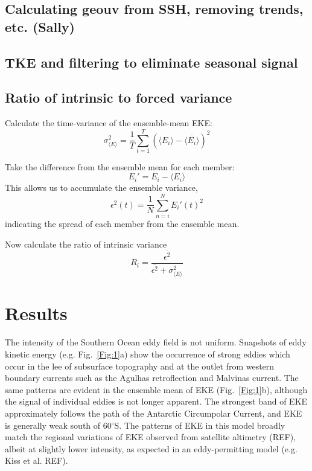 \documentclass{agujournal2019}
\begin{document}
\subsection{Calculating geouv from SSH, removing trends, etc. (Sally)}

\subsection{TKE and filtering  to eliminate seasonal signal}

\subsection{Ratio of intrinsic to forced variance}

Calculate the time-variance of the ensemble-mean EKE:
$$\sigma^2_{\langle E \rangle} = \frac{1}{T} \sum_{t=1}^T \left(\langle E_i \rangle -  \overline{\langle E_i \rangle}\right)^2$$

Take the difference from the ensemble mean for each member:
$$E_i' = E_i - \langle E_i \rangle$$
This allows us to accumulate the ensemble variance,
$$\epsilon^2(t) = \frac{1}{N} \sum_{n=i}^N E_i'(t)^2$$
indicating the spread of each member from the ensemble mean.

Now calculate the ratio of intrinsic variance
$$ R_i =  \frac{\overline{\epsilon^2}}{\overline{\epsilon^2} + \sigma^2_{\langle E \rangle}}$$



\section{Results}

The intensity of the Southern Ocean eddy field is not uniform.
Snapshots of eddy kinetic energy (e.g. Fig.~\ref{Fig:1}a) show the occurrence of strong eddies which occur in the lee of subsurface topography and at the outlet from western boundary currents such as the Agulhas retroflection and Malvinas current.
The same patterns are evident in the ensemble mean of EKE (Fig.~\ref{Fig:1}b), although the signal of individual eddies is not longer apparent.
The strongest band of EKE approximately follows the path of the Antarctic Circumpolar Current, and EKE is generally weak south of 60$^\circ$S.
The patterns of EKE in this model broadly match the regional variations of EKE observed from satellite altimetry (REF), albeit at slightly lower intensity, as expected in an eddy-permitting model (e.g. Kiss et al. REF).
\end{document}
